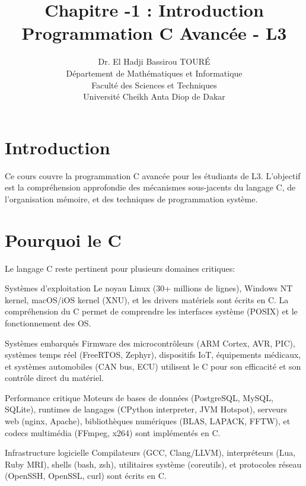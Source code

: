 \documentclass[11pt,a4paper]{article}
\title{\textbf{Chapitre -1 : Introduction}\\
\large Programmation C Avancée - L3}
\author{Dr. El Hadji Bassirou TOURÉ\\
Département de Mathématiques et Informatique\\
Faculté des Sciences et Techniques\\
Université Cheikh Anta Diop de Dakar}
\date{}
\begin{document}
\maketitle

\section{Introduction}

Ce cours couvre la programmation C avancée pour les étudiants de L3. L'objectif est la compréhension approfondie des mécanismes sous-jacents du langage C, de l'organisation mémoire, et des techniques de programmation système.

\section{Pourquoi le C}

Le langage C reste pertinent pour plusieurs domaines critiques:

\begin{definitionbox}{Systèmes d'exploitation}
Le noyau Linux (30+ millions de lignes), Windows NT kernel, macOS/iOS kernel (XNU), et les drivers matériels sont écrits en C. La compréhension du C permet de comprendre les interfaces système (POSIX) et le fonctionnement des OS.
\end{definitionbox}

\begin{definitionbox}{Systèmes embarqués}
Firmware des microcontrôleurs (ARM Cortex, AVR, PIC), systèmes temps réel (FreeRTOS, Zephyr), dispositifs IoT, équipements médicaux, et systèmes automobiles (CAN bus, ECU) utilisent le C pour son efficacité et son contrôle direct du matériel.
\end{definitionbox}

\begin{definitionbox}{Performance critique}
Moteurs de bases de données (PostgreSQL, MySQL, SQLite), runtimes de langages (CPython interpreter, JVM Hotspot), serveurs web (nginx, Apache), bibliothèques numériques (BLAS, LAPACK, FFTW), et codecs multimédia (FFmpeg, x264) sont implémentés en C.
\end{definitionbox}

\begin{definitionbox}{Infrastructure logicielle}
Compilateurs (GCC, Clang/LLVM), interpréteurs (Lua, Ruby MRI), shells (bash, zsh), utilitaires système (coreutils), et protocoles réseau (OpenSSH, OpenSSL, curl) sont écrits en C.
\end{definitionbox}
\end{document}
